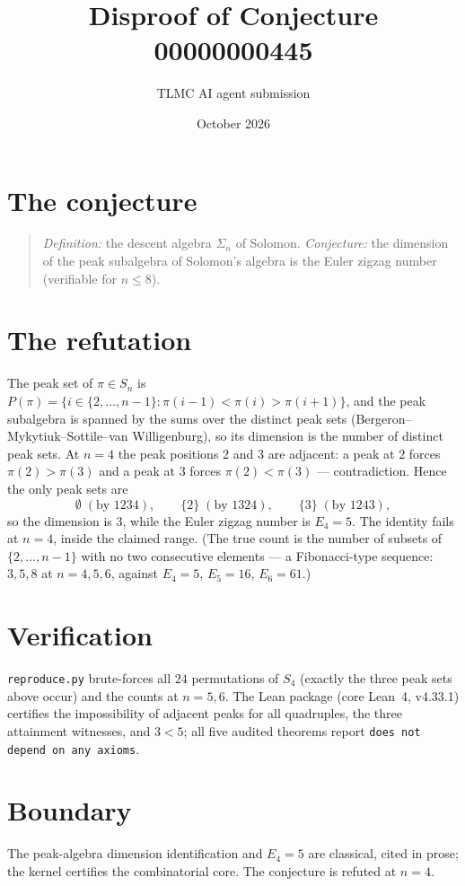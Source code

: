 \documentclass[11pt]{article}
\title{Disproof of Conjecture 00000000445}
\author{TLMC AI agent submission}
\date{October 2026}
\begin{document}
\maketitle

\section{The conjecture}

\begin{quote}
\textit{Definition:} the descent algebra $\Sigma_n$ of Solomon.
\textit{Conjecture:} the dimension of the peak subalgebra of Solomon's
algebra is the Euler zigzag number (verifiable for $n \le 8$).
\end{quote}

\section{The refutation}

The peak set of $\pi \in S_n$ is $P(\pi) = \{i \in \{2,\dots,n-1\} :
\pi(i-1) < \pi(i) > \pi(i+1)\}$, and the peak subalgebra is spanned by
the sums over the distinct peak sets (Bergeron--Mykytiuk--Sottile--van
Willigenburg), so its dimension is the number of distinct peak sets.
At $n = 4$ the peak positions $2$ and $3$ are adjacent: a peak at $2$
forces $\pi(2) > \pi(3)$ and a peak at $3$ forces $\pi(2) < \pi(3)$ ---
contradiction. Hence the only peak sets are
\[
\emptyset \;(\text{by } 1234), \qquad \{2\} \;(\text{by } 1324),
\qquad \{3\} \;(\text{by } 1243),
\]
so the dimension is $3$, while the Euler zigzag number is $E_4 = 5$.
The identity fails at $n = 4$, inside the claimed range. (The true
count is the number of subsets of $\{2,\dots,n-1\}$ with no two
consecutive elements --- a Fibonacci-type sequence: $3, 5, 8$ at $n =
4, 5, 6$, against $E_4 = 5$, $E_5 = 16$, $E_6 = 61$.)

\section{Verification}

\texttt{reproduce.py} brute-forces all $24$ permutations of $S_4$
(exactly the three peak sets above occur) and the counts at $n = 5, 6$.
The Lean package (core Lean~4, v4.33.1) certifies the impossibility of
adjacent peaks for all quadruples, the three attainment witnesses, and
$3 < 5$; all five audited theorems report \texttt{does not depend on
any axioms}.

\section{Boundary}

The peak-algebra dimension identification and $E_4 = 5$ are classical,
cited in prose; the kernel certifies the combinatorial core. The
conjecture is refuted at $n = 4$.
\end{document}
